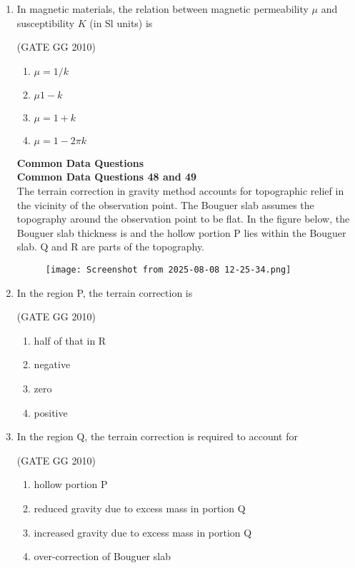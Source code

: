 \documentclass[journal]{IEEEtran}
\begin{document}
\begin{enumerate}[start=26]
\item In magnetic materials, the relation between magnetic permeability $\mu$ and susceptibility $K$ (in Sl units) is

\hfill{(GATE GG 2010)}

\begin{enumerate}
    \item $\mu =1/k$
    \item $\mu 1-k$
    \item $\mu=1+k$
    \item $\mu=1-2\pi k$
\end{enumerate}
\vspace{0.7cm}
\textbf{Common Data Questions}\\
\vspace{0.6cm}
\textbf{Common Data Questions 48 and 49}\\
The terrain correction in gravity method accounts for topographic relief in the vicinity of the observation point. The Bouguer slab assumes the topography around the observation point to be flat. In the figure below, the Bouguer slab thickness is and the hollow portion P lies within the Bouguer slab. Q and R are parts of the topography.

\begin{figure}[H]
    \centering
    \texttt{[image: Screenshot from 2025-08-08 12-25-34.png]} 
    \caption{}
    \label{fig:48}
\end{figure}
\item In the region P, the terrain correction is

\hfill{(GATE GG 2010)}

\begin{enumerate}
    \item  half of that in R
    \item negative
\item  zero
\item positive 
\end{enumerate}
\item In the region Q, the terrain correction is required to account for

\hfill{(GATE GG 2010)}

\begin{enumerate}
    \item  hollow portion P
\item  reduced gravity due to excess mass in portion Q
\item  increased gravity due to excess mass in portion Q
\item  over-correction of Bouguer slab


\end{enumerate}
\end{enumerate}
\end{document}
